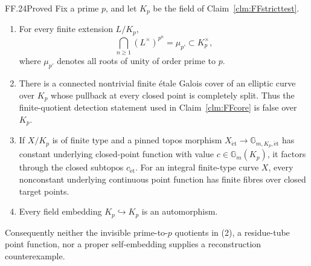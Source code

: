\begin{claim}{FF.24}{Proved}\label{clm:FFstrictdetection}
Fix a prime \(p\), and let \(K_p\) be the field of
Claim~\ref{clm:FFstricttest}.
\begin{enumerate}
\item For every finite extension \(L/K_p\),
\[
 \bigcap_{n\geq1}(L^\times)^{p^n}=\mu_{p'}\subset K_p^\times,
                                                        \tag{FF.24.1}
\]
where \(\mu_{p'}\) denotes all roots of unity of order
prime to \(p\).
\item There is a connected nontrivial finite \'etale Galois
cover of an elliptic curve over \(K_p\) whose pullback
at every closed point is completely split. Thus the
finite-quotient detection statement used in
Claim~\ref{clm:FFcore} is false over \(K_p\).
\item If \(X/K_p\) is of finite type and a pinned topos
morphism \(X_{\mathrm{\acute et}}\to
\mathbb G_{m,K_p,\mathrm{\acute et}}\) has constant
underlying closed-point function with value
\(c\in\mathbb G_m(K_p)\), it factors through the
closed subtopos \(c_{\mathrm{\acute et}}\).
For an integral finite-type curve \(X\), every
nonconstant underlying continuous point function has
finite fibres over closed target points.
\item Every field embedding \(K_p\hookrightarrow K_p\)
is an automorphism.
\end{enumerate}
Consequently neither the invisible prime-to-\(p\)
quotients in (2), a residue-tube point function, nor
a proper self-embedding supplies a reconstruction
counterexample.
\end{claim}


